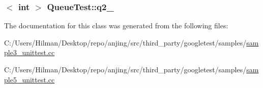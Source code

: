\subsubsection[{q2\+\_\+}]{$<$ int $>$ Queue\+Test\+::q2\+\_\+\hspace{0.3cm}{\ttfamily [protected]}}\label{class_queue_test_aeb7a2e3f6ce2d97d84eb1e01468adc2f}


The documentation for this class was generated from the following files\+:\begin{DoxyCompactItemize}
\item 
C\+:/\+Users/\+Hilman/\+Desktop/repo/anjing/src/third\+\_\+party/googletest/samples/\hyperlink{sample3__unittest_8cc}{sample3\+\_\+unittest.\+cc}\item 
C\+:/\+Users/\+Hilman/\+Desktop/repo/anjing/src/third\+\_\+party/googletest/samples/\hyperlink{sample5__unittest_8cc}{sample5\+\_\+unittest.\+cc}\end{DoxyCompactItemize}
